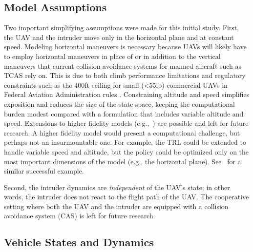 \subsection{Model Assumptions}\label{sec:assumptions}

Two important simplifying assumptions were made for this initial study. First, the UAV and the intruder move only in the horizontal plane and at constant speed. Modeling horizontal maneuvers is necessary because UAVs will likely have to employ horizontal maneuvers in place of or in addition to the vertical maneuvers that current collision avoidance systems for manned aircraft such as TCAS rely on. This is due to both climb performance limitations and regulatory constraints such as the \num{400}\si{ft} ceiling for small (\num{<55}\si{lb}) commercial UAVs in Federal Aviation Administration rules \cite{faa2018small}. Constraining altitude and speed simplifies exposition and reduces the size of the state space, keeping the computational burden modest compared with a formulation that includes variable altitude and speed. Extensions to higher fidelity models (e.g.,~\cite{MJK-MWME-LPE-JKK-JDG:10}) are possible and left for future research.
A higher fidelity model would present a computational challenge, but perhaps not an insurmountable one.
For example, the TRL could be extended to handle variable speed and altitude, but the policy could be optimized only on the most important dimensions of the model (e.g., the horizontal plane). See~\cite{MJK-JPC-PPR:10} for a similar successful example.

Second, the intruder dynamics are \emph{independent} of the UAV's state; in other words, the intruder does not react to the flight path of the UAV. The cooperative setting where both the UAV and the intruder are equipped with a collision avoidance system (CAS) \cite{EJR:14,CT-GJP-SSS:98,MJK-JPC:11} is left for future research.

\subsection{Vehicle States and Dynamics}\label{sec:veh}

